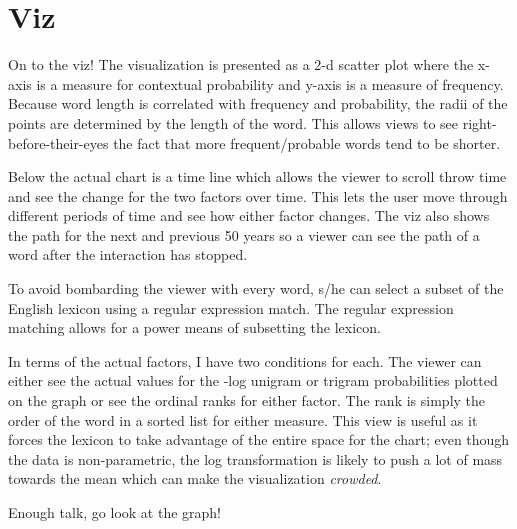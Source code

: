 \documentclass[11pt]{article}
\begin{document}
\section{Viz}

On to the viz! The visualization is presented as a 2-d scatter plot where the x-axis is a measure for contextual probability and y-axis is a measure of frequency. Because word length is correlated with frequency and probability, the radii of the points are determined by the length of the word. This allows views to see right-before-their-eyes the fact that more frequent/probable words tend to be shorter. 

Below the actual chart is a time line which allows the viewer to scroll throw time and see the change for the two factors over time. This lets the user move through different periods of time and see how either factor changes. The viz also shows the path for the next and previous 50 years so a viewer can see the path of a word after the interaction has stopped.

To avoid bombarding the viewer with every word, s/he can select a subset of the English lexicon using a regular expression match. The regular expression matching allows for a power means of subsetting the lexicon. 

In terms of the actual factors, I have two conditions for each. The viewer can either see the actual values for the -log unigram or trigram probabilities plotted on the graph or see the ordinal ranks for either factor. The rank is simply the order of the word in a sorted list for either measure. This view is useful as it forces the lexicon to take advantage of the entire space for the chart; even though the data is non-parametric, the log transformation is likely to push a lot of mass towards the mean which can make the visualization {\it crowded}.

Enough talk, go look at the graph!
\end{document}
